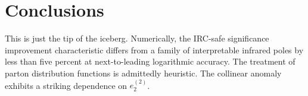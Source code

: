 \section{Conclusions}\label{sec:conclusions}

This is just the tip of the iceberg. Numerically, the IRC-safe
significance improvement characteristic differs from a family of
interpretable infrared poles by less than five percent at
next-to-leading logarithmic accuracy. The treatment of parton
distribution functions is admittedly heuristic. The collinear anomaly
exhibits a striking dependence on $e_2^{(2)}$.

